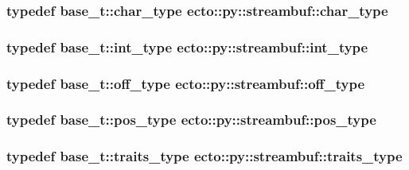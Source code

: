 \subsubsection[{char\+\_\+type}]{\setlength{\rightskip}{0pt plus 5cm}typedef base\+\_\+t\+::char\+\_\+type {\bf ecto\+::py\+::streambuf\+::char\+\_\+type}}\label{classecto_1_1py_1_1streambuf_acd255be6a50678c600c431c5bea7bc7b}
\hypertarget{classecto_1_1py_1_1streambuf_a1bfd3d3f54b7b91a5ea54f980436a617}{}
\subsubsection[{int\+\_\+type}]{\setlength{\rightskip}{0pt plus 5cm}typedef base\+\_\+t\+::int\+\_\+type {\bf ecto\+::py\+::streambuf\+::int\+\_\+type}}\label{classecto_1_1py_1_1streambuf_a1bfd3d3f54b7b91a5ea54f980436a617}
\hypertarget{classecto_1_1py_1_1streambuf_aa01772d1599fc51089a209a69fcab7c7}{}
\subsubsection[{off\+\_\+type}]{\setlength{\rightskip}{0pt plus 5cm}typedef base\+\_\+t\+::off\+\_\+type {\bf ecto\+::py\+::streambuf\+::off\+\_\+type}}\label{classecto_1_1py_1_1streambuf_aa01772d1599fc51089a209a69fcab7c7}
\hypertarget{classecto_1_1py_1_1streambuf_afdd3f60ff0d0b2f4645742690b7d27dd}{}
\subsubsection[{pos\+\_\+type}]{\setlength{\rightskip}{0pt plus 5cm}typedef base\+\_\+t\+::pos\+\_\+type {\bf ecto\+::py\+::streambuf\+::pos\+\_\+type}}\label{classecto_1_1py_1_1streambuf_afdd3f60ff0d0b2f4645742690b7d27dd}
\hypertarget{classecto_1_1py_1_1streambuf_aaf8a5185360343bec29d804d5b416417}{}
\subsubsection[{traits\+\_\+type}]{\setlength{\rightskip}{0pt plus 5cm}typedef base\+\_\+t\+::traits\+\_\+type {\bf ecto\+::py\+::streambuf\+::traits\+\_\+type}}\label{classecto_1_1py_1_1streambuf_aaf8a5185360343bec29d804d5b416417}


